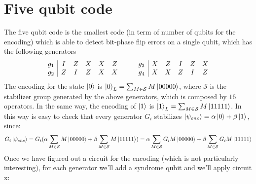 \documentclass{article}
\begin{document}
	 \section{Five qubit code}
	 The five qubit code is the smallest code (in term of number of qubits for the encoding) which is able to detect bit-phase flip errors on a single qubit, which has the following generators 
	 \[
	 \begin{array}{c|c c c c c}
	 	g_1 & I & Z & X & X & Z\\
	 	g_2 & Z & I & Z & X & X
	 \end{array}\qquad
	 \begin{array}{c|c c c c c}
	 	g_3 & X & Z & I & Z & X\\
	 	g_4 & X & X & Z & I & Z
	 \end{array}
	 \]
	 The encoding for the state $\ket{0}$ is $\ket{0}_L = \sum_{M \in \mathcal{S}}M\ket{00000}$, where $\mathcal{S}$ is the stabilizer group generated by the above generators, which is composed by $16$ operators. In the same way, the encoding of $\ket{1}$ is $\ket{1}_L = \sum_{M \in \mathcal{S}}M\ket{11111}$. In this way is easy to check that every generator $G_i$ stabilizes $\ket{\psi_{enc}} = \alpha\ket{0} + \beta\ket{1}$, since:
	 \[ G_i\ket{\psi_{enc}} = G_i(\alpha\sum_{M \in \mathcal{S}}M\ket{00000} + \beta\sum_{M \in \mathcal{S}}M\ket{11111}) = \alpha\sum_{M \in \mathcal{S}}G_iM\ket{00000} + \beta\sum_{M \in \mathcal{S}}G_iM\ket{11111}\]
	 Once we have figured out a circuit for the encoding (which is not particularly interesting), for each generator we'll add a syndrome qubit and we'll apply circuit x: 
	 \begin{figure}[H]
	 	\centering
	 \end{figure}
\end{document}
